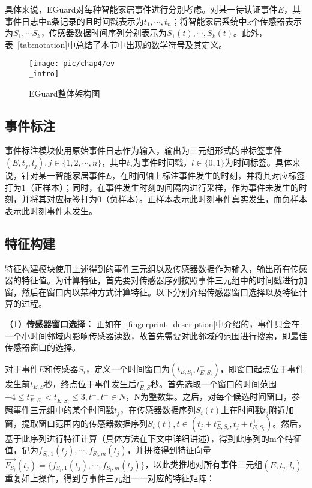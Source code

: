 具体来说，EGuard对每种智能家居事件进行分别考虑。对某一待认证事件$E$，其事件日志中n条记录的且时间戳表示为$t_1,\cdots ,t_n$；将智能家居系统中k个传感器表示为$S_1,\cdots S_k$，传感器数据时间序列分别表示为$S_1(t),\cdots ,S_k(t)$。此外，表~\ref{tab:notation}中总结了本节中出现的数学符号及其定义。

\begin{figure}[!h]
	\centering
	\texttt{[image: pic/chap4/ev\\\_intro]}
	\caption{EGuard整体架构图}
	\label{fig:ev_intro}
\end{figure}

\subsection{事件标注}
\label{subsec:labeling}
事件标注模块使用原始事件日志作为输入，输出为三元组形式的带标签事件$(E,t_j,l_j),j\in \{1,2,\cdots,n\}$，其中$t_j$为事件时间戳，$l\in \{0,1\}$为时间标签。具体来说，针对某一智能家居事件$E$，在时间轴上标注事件发生的时刻，并将其对应标签打为1（正样本）；同时，在事件发生时刻的间隔内进行采样，作为事件未发生的时刻，并将其对应标签打为0（负样本）。正样本表示此时刻事件真实发生，而负样本表示此时刻事件未发生。

\subsection{特征构建}
\label{subsec:feat_cons}
特征构建模块使用上述得到的事件三元组以及传感器数据作为输入，输出所有传感器的特征值。为计算特征，首先要对传感器序列按照事件三元组中的时间戳进行加窗，然后在窗口内以某种方式计算特征。以下分别介绍传感器窗口选择以及特征计算的过程。

\textbf{（1）传感器窗口选择：}
正如在~\ref{fingerprint_description}中介绍的，事件只会在一个小时间邻域内影响传感器读数，故首先需要对此邻域的范围进行搜索，即最佳传感器窗口的选择。

对于事件$E$和传感器$S_i$，定义一个时间窗口为$(t_{E,S_i}^-,t_{E,S_i}^+)$，即窗口起点位于事件发生前$t_{E,S}^-$秒，终点位于事件发生后$t_{E,S}^+$秒。首先选取一个窗口的时间范围$-4\leq t_{E,S_i}^- < t_{E,S_i}^+\leq 3,t^-,t^+\in N$，N为整数集。之后，对每个候选时间窗口，参照事件三元组中的某个时间戳$t_j$，在传感器数据序列$S_i(t)$上在时间戳$t_j$附近加窗，提取窗口范围内的传感器数据序列$S_i (t),t\in (t_j+t_{E,S_i}^-,t_j+t_{E,S_i}^+)$。然后，基于此序列进行特征计算（具体方法在下文中详细讲述），得到此序列的m个特征值，记为$f_{S_i,1}(t_j),\cdots ,f_{S_i,m}(t_j)$，并拼接得到特征向量$\vec{F_{S_i}}(t_j)=\{f_{S_i,1}(t_j),\cdots ,f_{S_i,m} (t_j)\}$，以此类推地对所有事件三元组$(E,t_j,l_j)$重复如上操作，得到与事件三元组一一对应的特征矩阵：

